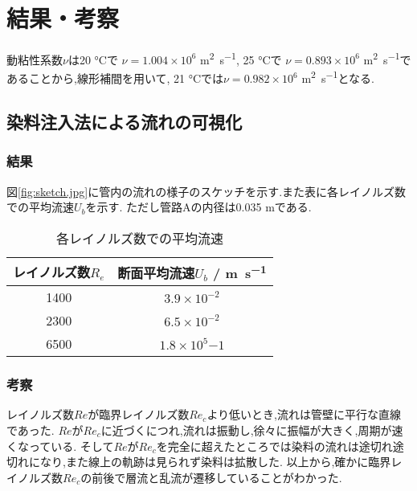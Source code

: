 \section{結果・考察}
動粘性系数$\nu$は20 \si{\degreeCelsius}で
$\nu=1.004\times10^6$ \si{\metre^2.\second^{-1}}, 25 \si{\degreeCelsius}で
$\nu=0.893\times10^6$ \si{\metre^2.\second^{-1}}であることから,線形補間を用いて,
21 \si{\degreeCelsius}では$\nu=0.982\times10^6$ \si{\metre^2.\second^{-1}}となる.
\subsection{染料注入法による流れの可視化}
\subsubsection{結果}
図\ref{fig:sketch.jpg}に管内の流れの様子のスケッチを示す.また表に各レイノルズ数での平均流速$U_b$を示す.
ただし管路Aの内径は0.035 mである.
\begin{table}[htbp]
   \caption{各レイノルズ数での平均流速}
   \label{tab:染料注入法}
   \centering
   \begin{tabular}{cc}
     \hline
     レイノルズ数$R_e$&断面平均流速$U_b$ / \si{\metre.\second^{-1}}\\
     \hline \hline
     1400&$3.9\times10^{-2}$\\
     2300&$6.5\times10^{-2}$\\
     6500&$1.8\times10^5{-1}$\\
     \hline
   \end{tabular}
\end{table}
\subsubsection{考察}
レイノルズ数$Re$が臨界レイノルズ数$Re_c$より低いとき,流れは管壁に平行な直線であった.
$Re$が$Re_c$に近づくにつれ,流れは振動し,徐々に振幅が大きく,周期が速くなっている.
そして$Re$が$Re_c$を完全に超えたところでは染料の流れは途切れ途切れになり,また線上の軌跡は見られず染料は拡散した.
以上から,確かに臨界レイノルズ数$Re_c$の前後で層流と乱流が遷移していることがわかった.

